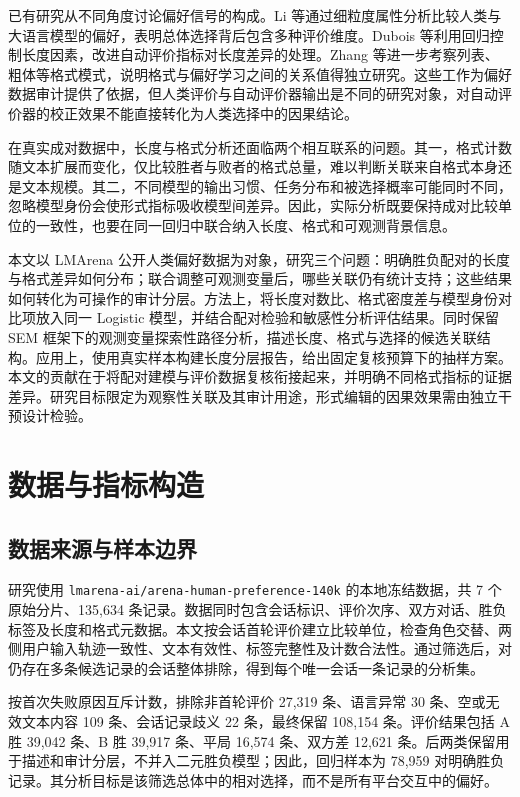 \documentclass[UTF8,11pt,a4paper,fontset=windows]{ctexart}
\numberwithin{equation}{section}
\begin{document}
已有研究从不同角度讨论偏好信号的构成。Li 等\cite{li}通过细粒度属性分析比较人类与大语言模型的偏好，表明总体选择背后包含多种评价维度。Dubois 等\cite{dubois}利用回归控制长度因素，改进自动评价指标对长度差异的处理。Zhang 等\cite{zhang}进一步考察列表、粗体等格式模式，说明格式与偏好学习之间的关系值得独立研究。这些工作为偏好数据审计提供了依据，但人类评价与自动评价器输出是不同的研究对象，对自动评价器的校正效果不能直接转化为人类选择中的因果结论。

在真实成对数据中，长度与格式分析还面临两个相互联系的问题。其一，格式计数随文本扩展而变化，仅比较胜者与败者的格式总量，难以判断关联来自格式本身还是文本规模。其二，不同模型的输出习惯、任务分布和被选择概率可能同时不同，忽略模型身份会使形式指标吸收模型间差异。因此，实际分析既要保持成对比较单位的一致性，也要在同一回归中联合纳入长度、格式和可观测背景信息。

本文以 LMArena 公开人类偏好数据为对象，研究三个问题：明确胜负配对的长度与格式差异如何分布；联合调整可观测变量后，哪些关联仍有统计支持；这些结果如何转化为可操作的审计分层。方法上，将长度对数比、格式密度差与模型身份对比项放入同一 Logistic 模型，并结合配对检验和敏感性分析评估结果。同时保留 SEM 框架下的观测变量探索性路径分析，描述长度、格式与选择的候选关联结构。应用上，使用真实样本构建长度分层报告，给出固定复核预算下的抽样方案。本文的贡献在于将配对建模与评价数据复核衔接起来，并明确不同格式指标的证据差异。研究目标限定为观察性关联及其审计用途，形式编辑的因果效果需由独立干预设计检验。

\section{数据与指标构造}
\subsection{数据来源与样本边界}
研究使用 \texttt{lmarena-ai/arena-human-preference-140k} 的本地冻结数据\cite{dataset}，共 7 个原始分片、135,634 条记录。数据同时包含会话标识、评价次序、双方对话、胜负标签及长度和格式元数据。本文按会话首轮评价建立比较单位，检查角色交替、两侧用户输入轨迹一致性、文本有效性、标签完整性及计数合法性。通过筛选后，对仍存在多条候选记录的会话整体排除，得到每个唯一会话一条记录的分析集。

按首次失败原因互斥计数，排除非首轮评价 27,319 条、语言异常 30 条、空或无效文本内容 109 条、会话记录歧义 22 条，最终保留 108,154 条。评价结果包括 A 胜 39,042 条、B 胜 39,917 条、平局 16,574 条、双方差 12,621 条。后两类保留用于描述和审计分层，不并入二元胜负模型；因此，回归样本为 78,959 对明确胜负记录。其分析目标是该筛选总体中的相对选择，而不是所有平台交互中的偏好。
\end{document}
